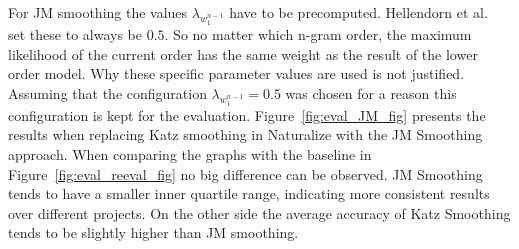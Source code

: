 For JM smoothing the values $\lambda_{w_1^{n-1}}$ have to be precomputed. Hellendorn et al.~\cite{nestedngram} set these to always be $0.5$. So no matter which n-gram order, the maximum likelihood of the current order has the same weight as the result of the lower order model. Why these specific parameter values are used is not justified. Assuming that the configuration $\lambda_{w_1^{n-1}}=0.5$ was chosen for a reason this configuration is kept for the evaluation. Figure~\ref{fig:eval_JM_fig} presents the results when replacing Katz smoothing in Naturalize with the JM Smoothing approach. When comparing the graphs with the baseline in Figure~\ref{fig:eval_reeval_fig} no big difference can be observed. JM Smoothing tends to have a smaller inner quartile range, indicating more consistent results over different projects. On the other side the average accuracy of Katz Smoothing tends to be slightly higher than JM smoothing.
\noindent{}